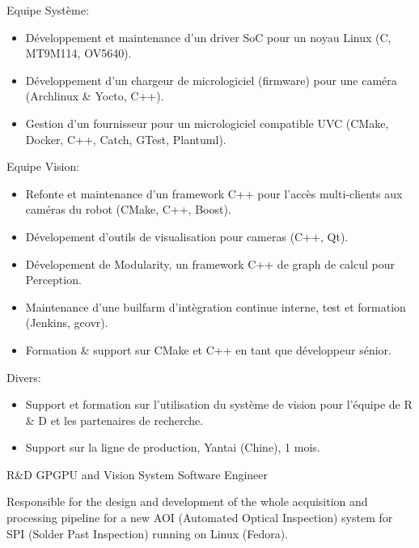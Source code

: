 \documentclass{article}
\begin{document}
\begin{llist}
{Equipe Syst\`{e}me:
\vspace{-0.33cm}
\begin{itemize}
	\item D\'{e}veloppement et maintenance d'un driver SoC pour un noyau Linux (C, MT9M114, OV5640).
	\item D\'{e}veloppement d'un chargeur de micrologiciel (firmware) pour une cam\'{e}ra (Archlinux \& Yocto, C++).
	\item Gestion d'un fournisseur pour un micrologiciel compatible UVC (CMake, Docker, C++, Catch, GTest, Plantuml).
\end{itemize}
Equipe Vision:
\vspace{-0.33cm}
\begin{itemize}
	\item Refonte et maintenance d'un framework C++ pour l'acc\`{e}s multi-clients aux cam\'{e}ras du robot (CMake, C++, Boost).
	\item D\'{e}velopement d'outils de visualisation pour cameras (C++, Qt).
	\item D\'{e}velopement de Modularity, un framework C++ de graph de calcul pour Perception.
	\item Maintenance d'une builfarm d'int\`{e}gration continue interne, test et formation (Jenkins, gcovr).
	\item Formation \& support sur CMake et C++ en tant que d\'{e}veloppeur s\'{e}nior.
\end{itemize}
Divers:
\vspace{-0.33cm}
\begin{itemize}
	\item Support et formation sur l'utilisation du syst\`{e}me de vision pour l'\'{e}quipe de R \& D et les partenaires de recherche.
	\item Support sur la ligne de production, Yantai (Chine), 1 mois.
\end{itemize}
}

 {
R\&D GPGPU and Vision System Software Engineer\\
\vspace{-0.33cm}

Responsible for the design and development of the whole acquisition and processing pipeline
for a new AOI (Automated Optical Inspection) system for SPI (Solder Past Inspection)
 running on Linux (Fedora).

}
\end{llist}
\end{document}
